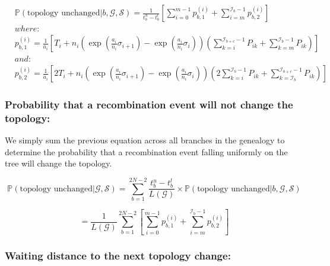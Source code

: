 \documentclass[11pt]{article}
\begin{document}
\begin{equation}
\begin{aligned}
    &\mathbb{P}(\textrm{topology unchanged}|b, \mathcal{G},\mathcal{S}) = \frac{1}{t_b^u-t_b^l}\left[\sum_{i=0}^{m-1}p_{b,1}^{(i)}+\sum_{i=m}^{\mathcal{I}_b-1}p_{b,2}^{(i)}\right] \\
    &where: \\
    &p_{b,1}^{(i)} = \frac{1}{a_i}\left[T_i+n_i\left(\exp\left(\frac{a_i}{n_i}\sigma_{i+1}\right)-\exp\left(\frac{a_i}{n_i}\sigma_i\right)\right)\left(\sum_{k=i}^{\mathcal{I}_{b+c}-1}P_{ik}+\sum_{k=m}^{\mathcal{I}_b-1}P_{ik}\right)\right] \\
    &and: \\
    &p_{b,2}^{(i)} = \frac{1}{a_i}\left[2T_i + n_i\left(\exp\left(\frac{a_i}{n_i}\sigma_{i+1}\right)-\exp\left(\frac{a_i}{n_i}\sigma_{i}\right)\right)\left(2\sum_{k=i}^{\mathcal{I}_b-1}P_{ik}+\sum_{k=\mathcal{I}_b}^{\mathcal{I}_{b+c}-1}P_{ik}\right)\right]
    \end{aligned}
\end{equation}

\subsubsection{Probability that a recombination event will not change the topology:}

We simply sum the previous equation across all branches in the genealogy to 
determine the probability that a recombination event falling uniformly on the 
tree will change the topology.

\begin{equation*}
    \mathbb{P}(\textrm{topology unchanged}| \mathcal{G},\mathcal{S}) = \sum_{b=1}^{2N-2}\frac{t_b^u-t_b^l}{L(\mathcal{G})} \times \mathbb{P}(\textrm{topology unchanged}|b, \mathcal{G},\mathcal{S})
\end{equation*}

\begin{equation}
    = \frac{1}{L(\mathcal{G})}\sum_{b=1}^{2N-2}\left[\sum_{i=0}^{m-1}p_{b,1}^{(i)}+\sum_{i=m}^{\mathcal{I}_b-1}p_{b,2}^{(i)}\right]
\end{equation}

\subsubsection{Waiting distance to the next topology change:}
\end{document}
